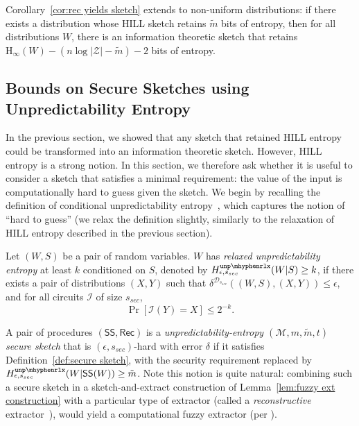 \documentclass{llncs}
\newcommand{\defref}[1]{\mbox{Definition~\ref{#1}}}
\newcommand{\corref}[1]{\mbox{Corollary~\ref{#1}}}
\newcommand{\lemref}[1]{\mbox{Lemma~\ref{#1}}}
\newcommand{\class}[1]{{\ensuremath{\mathsf{#1}}}}
\newcommand{\sketch}{\ensuremath{\class{SS}}\xspace}
\newcommand{\rec}{\ensuremath{\class{Rec}}\xspace}
\newcommand{\unprlx}{\ensuremath{\mathtt{unp\mhyphen rlx}}\xspace}
\newcommand{\Hoo}{\mathrm{H}_\infty}
\begin{document}
\corref{cor:rec yields sketch} extends to non-uniform distributions: if there exists a distribution whose HILL sketch retains $\tilde{m}$ bits of entropy, then for all distributions $W$, there is an information theoretic sketch that retains $\Hoo(W) - (n\log |\mathcal{Z}|-\tilde{m})-2$ bits of entropy.

\subsection{Bounds on Secure Sketches using Unpredictability Entropy}
\label{sec:imp unp sketch}
In the previous section, we showed that any sketch that retained HILL entropy could be transformed into an information theoretic sketch.  However, HILL entropy is a strong notion.  In this section, we therefore ask whether it is useful to consider a sketch that satisfies a minimal requirement: the value of the input is computationally hard to guess given the sketch.  We begin by recalling the definition of conditional unpredictability entropy~\cite[Definition 7]{DBLP:conf/eurocrypt/HsiaoLR07}, which captures the notion of ``hard to guess'' (we relax the definition slightly, similarly to the relaxation of HILL entropy described in the previous section).

\begin{definition}
\label{def:unp entropy}
Let  $(W, S)$ be a pair of random variables. $W$ has \emph{relaxed unpredictability entropy} at least $k$ conditioned on $S$, denoted by $H^{\unprlx}_{\epsilon, s_{sec}} (W|S) \geq k$, if there exists a pair of distributions $(X, Y)$ such that $\delta^{\mathcal{D}_{s_{sec}}}((W, S),(X, Y))\leq \epsilon$, and for all circuits $\mathcal{I}$ of size $s_{sec}$,
\[
\Pr[\mathcal{I}(Y) = X ] \leq 2^{-k}
.\]
\end{definition}

A pair of procedures $(\sketch, \rec)$ is a \emph{unpredictability-entropy $(\mathcal{M}, m, \tilde{m}, t)$ secure sketch} that is $(\epsilon, s_{sec})$-hard with error $\delta$ if it satisfies \defref{def:secure sketch}, with the security requirement replaced by $H^{\unprlx}_{\epsilon, s_{sec}}(W| \sketch(W))\geq \tilde{m}$.  
Note this notion is quite natural: combining such a secure sketch in a sketch-and-extract construction of  \lemref{lem:fuzzy ext construction} with a particular type of extractor (called a \emph{reconstructive} extractor~\cite{barak-computational}), would yield a computational fuzzy extractor (per \cite[Lemma 6]{DBLP:conf/eurocrypt/HsiaoLR07}).  
\end{document}
